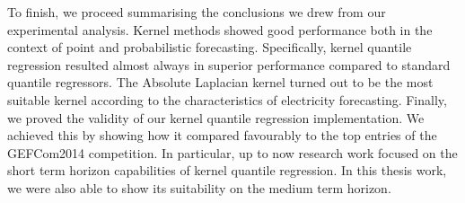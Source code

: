 To finish, we proceed summarising the conclusions we drew from our experimental analysis.
Kernel methods showed good performance both in the context of point and probabilistic forecasting.
Specifically, kernel quantile regression resulted almost always in superior performance compared to standard quantile regressors. The Absolute Laplacian kernel turned out to be the most suitable kernel according to the characteristics of electricity forecasting. Finally, we proved the validity of our kernel quantile regression implementation. We achieved this by showing how it compared favourably to the top entries of the GEFCom2014 competition. 
In particular, up to now research work focused on the short term horizon capabilities of kernel quantile regression. In this thesis work, we were also able to show its suitability on the medium term horizon. 